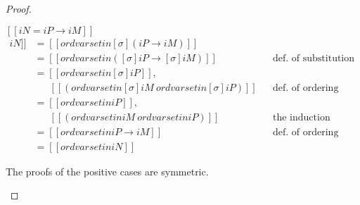 \begin{proof}
\begin{caseof}
    \item $[[iN = iP → iM]]$
       \begin{align*}
        [[ ord varset in [σ]iN ]] &= [[ ord varset in [σ](iP → iM) ]] \\
                                   &= [[ ord varset in ([σ]iP → [σ]iM) ]]
                                   && \text{def. of substitution}\\
                                   &= [[ ord varset in [σ]iP]],\\
                                   &\phantom{=} ~ [[(ord varset in [σ]iM \ {ord varset in [σ]iP}) ]]
                                   && \text{def. of ordering}\\
                                   &= [[ ord varset in iP]],\\
                                   &\phantom{=} ~ [[(ord varset in iM \ {ord varset in iP}) ]]
                                   && \text{the induction hypothesis}\\
                                   &= [[ ord varset in iP → iM ]]
                                   && \text{def. of ordering}\\
                                   &= [[ ord varset in iN ]]
       \end{align*}
    \item The proofs of the positive cases are symmetric.
  \end{caseof}
\end{proof}


